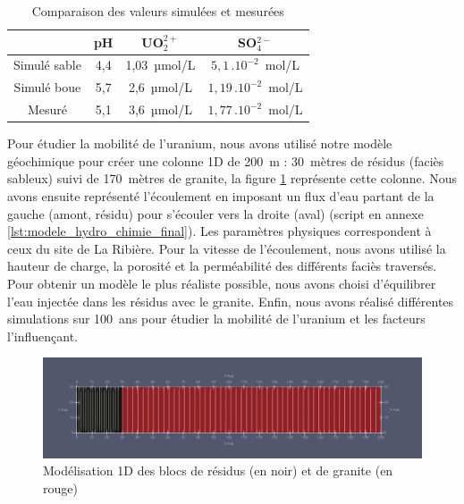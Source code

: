 \documentclass{article}
\begin{document}
	
\begin{table}[H]
    \centering    
    \caption{Comparaison des valeurs simulées et mesurées}
    \begin{tabular}{ |c |c |c |c |}
        \hline
         \textbf{} & \textbf{pH} & \textbf{UO$_2^{2+}$} & \textbf{SO$_4^{2-}$}\\ 
         \hline
         Simulé sable & 4,4 & 1,03~µmol/L & $5,1 \, . 10^{-2}$~mol/L \\ 
         \hline
         Simulé boue & 5,7 & 2,6~µmol/L & $1,19 \, . 10^{-2}$~mol/L  \\
         \hline
        Mesuré & 5,1 & 3,6~µmol/L & $1,77 \, . 10^{-2}$~mol/L  \\
         \hline
    \end{tabular}

    \label{tab:comparaison_valeurs_simul_mesure}
\end{table}


Pour étudier la mobilité de l’uranium, nous avons utilisé notre modèle géochimique pour créer une colonne 1D de 200~m : 30~mètres de résidus (faciès sableux) suivi de 170~mètres de granite, la figure \ref{fig:modele_bloc} représente cette colonne. Nous avons ensuite représenté l'écoulement en imposant un flux d’eau partant de la gauche (amont, résidu) pour s’écouler vers la droite (aval) (script en annexe \ref{lst:modele_hydro_chimie_final}). Les paramètres physiques correspondent à ceux du site de La Ribière. Pour la vitesse de l’écoulement, nous avons utilisé la hauteur de charge, la porosité et la perméabilité des différents faciès traversés. Pour obtenir un modèle le plus réaliste possible, nous avons choisi d’équilibrer l’eau injectée dans les résidus avec le granite.
Enfin, nous avons réalisé différentes simulations sur 100~ans pour étudier la mobilité de l’uranium et les facteurs l’influençant.

\begin{figure}[H]
    \centering
    \includegraphics[width=0.9\linewidth]{III_B_2_1.png}
    \caption{Modélisation 1D des blocs de résidus (en noir) et de granite (en rouge)}
    \label{fig:modele_bloc}
\end{figure}
\end{document}
